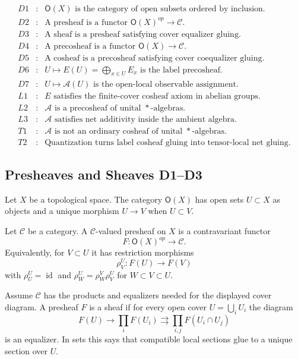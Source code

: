 \[
\begin{array}{rcl}
D1&:&\mathsf O(X)\text{ is the category of open subsets ordered by inclusion.}\\
D2&:&\text{A presheaf is a functor }\mathsf O(X)^{op}\to\mathcal C.\\
D3&:&\text{A sheaf is a presheaf satisfying cover equalizer gluing.}\\
D4&:&\text{A precosheaf is a functor }\mathsf O(X)\to\mathcal C.\\
D5&:&\text{A cosheaf is a precosheaf satisfying cover coequalizer gluing.}\\
D6&:&U\mapsto E(U)=\bigoplus_{x\in U}E_x\text{ is the label precosheaf.}\\
D7&:&U\mapsto\mathcal A(U)\text{ is the open-local observable assignment.}\\
L1&:&E\text{ satisfies the finite-cover cosheaf axiom in abelian groups.}\\
L2&:&\mathcal A\text{ is a precosheaf of unital }*\text{-algebras.}\\
L3&:&\mathcal A\text{ satisfies net additivity inside the ambient algebra.}\\
T1&:&\mathcal A\text{ is not an ordinary cosheaf of unital }*\text{-algebras.}\\
T2&:&\text{Quantization turns label cosheaf gluing into tensor-local net gluing.}
\end{array}
\]

\subsection{Presheaves and Sheaves D1--D3}

Let \(X\) be a topological space.  The category \(\mathsf O(X)\) has open
sets \(U\subset X\) as objects and a unique morphism \(U\to V\) when
\(U\subset V\).

Let \(\mathcal C\) be a category.  A \(\mathcal C\)-valued presheaf on \(X\)
is a contravariant functor
\[
  F:\mathsf O(X)^{op}\longrightarrow\mathcal C.
\]
Equivalently, for \(V\subset U\) it has restriction morphisms
\[
  \rho^U_V:F(U)\longrightarrow F(V)
\]
with \(\rho^U_U=\operatorname{id}\) and
\(\rho^U_W=\rho^V_W\rho^U_V\) for \(W\subset V\subset U\).

Assume \(\mathcal C\) has the products and equalizers needed for the displayed
cover diagram.  A presheaf \(F\) is a sheaf if for every open cover
\(U=\bigcup_iU_i\) the diagram
\[
  F(U)\longrightarrow \prod_i F(U_i)
  \rightrightarrows \prod_{i,j}F(U_i\cap U_j)
\]
is an equalizer.  In sets this says that compatible local sections glue to a
unique section over \(U\).

